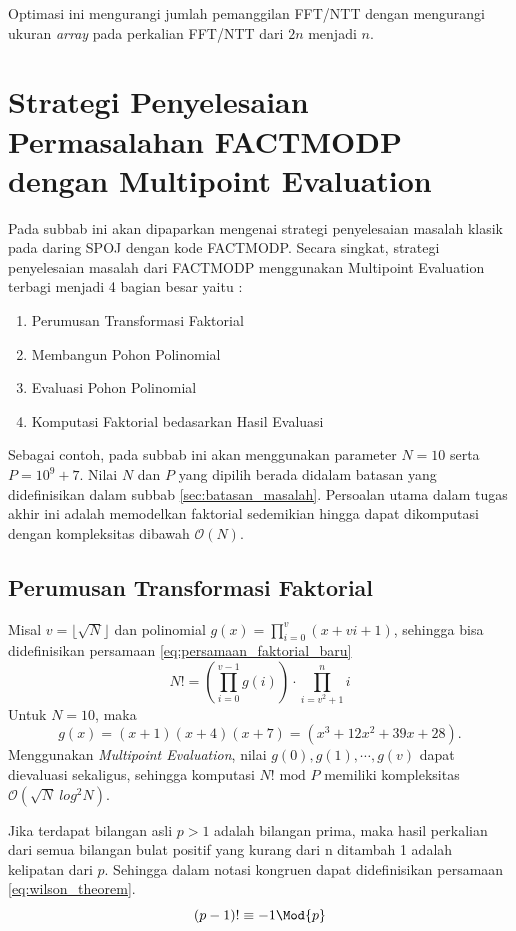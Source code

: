 Optimasi ini mengurangi jumlah pemanggilan FFT/NTT dengan mengurangi ukuran \textit{array} pada perkalian FFT/NTT dari $ 2n $ menjadi $ n $.

\section{ Strategi Penyelesaian Permasalahan FACTMODP dengan Multipoint Evaluation}
Pada subbab ini akan dipaparkan mengenai strategi penyelesaian masalah klasik pada daring SPOJ dengan kode FACTMODP. Secara singkat, strategi penyelesaian masalah dari FACTMODP menggunakan Multipoint Evaluation terbagi menjadi 4 bagian besar yaitu :
\begin{enumerate}
	\item Perumusan Transformasi Faktorial
	\item Membangun Pohon Polinomial
	\item Evaluasi Pohon Polinomial
	\item Komputasi Faktorial bedasarkan Hasil Evaluasi
\end{enumerate}

Sebagai contoh, pada subbab ini akan menggunakan parameter $ N = 10 $ serta $ P = 10^9 + 7 $. Nilai $ N $ dan $ P $ yang dipilih berada didalam batasan yang didefinisikan dalam subbab \ref{sec:batasan_masalah}. Persoalan utama dalam tugas akhir ini adalah memodelkan faktorial sedemikian hingga dapat dikomputasi dengan kompleksitas dibawah $ \mathcal{O}{(N)} $.

\subsection{ Perumusan Transformasi Faktorial}
\label{sec:perumusan_transformasi_faktorial}
Misal $ v = \lfloor \sqrt{N} \rfloor $ dan polinomial $ g(x) = \prod_{i=0}^v (x + vi + 1) $, sehingga bisa didefinisikan persamaan \eqref{eq:persamaan_faktorial_baru}
\begin{equation}
	N ! = \left( \prod_{i=0}^{v-1} g(i) \right) \cdot \prod_{i=v^2+1}^n i
	\label{eq:persamaan_faktorial_baru}
\end{equation}
Untuk $ N = 10 $, maka $$ g(x) = (x+1)(x+4)(x+7) = (x^3 + 12x^2 + 39x + 28). $$
Menggunakan \textit{Multipoint Evaluation}, nilai $ g(0), g(1), \cdots , g(v) $ dapat dievaluasi sekaligus, sehingga komputasi $ N! \text{ mod } P $ memiliki kompleksitas $ \mathcal{O}{(\sqrt{N}\ log^2 N )}. $
\begin{theo}
	\label{theo:wilson}
	Jika terdapat bilangan asli $ p > 1 $ adalah bilangan prima, maka hasil perkalian dari semua bilangan bulat positif yang kurang dari n ditambah 1 adalah kelipatan dari $ p $. Sehingga dalam notasi kongruen dapat didefinisikan persamaan \eqref{eq:wilson_theorem}.
	\begin{equation}
		(p - 1)! \equiv -1 \Mod{p}
		\label{eq:wilson_theorem}
	\end{equation}
\end{theo}



